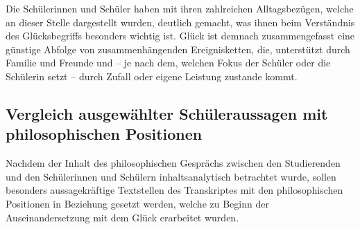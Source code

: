 Die Schülerinnen und Schüler haben mit ihren zahlreichen Alltagsbezügen, welche an dieser Stelle dargestellt wurden, deutlich gemacht, was ihnen beim Verständnis des Glücksbegriffs besonders wichtig ist. 
Glück ist demnach zusammengefasst eine günstige Abfolge von zusammenhängenden Ereignisketten, die, unterstützt durch Familie und Freunde und -- je nach dem, welchen Fokus der Schüler oder die Schülerin setzt -- durch Zufall oder eigene Leistung zustande kommt. 


\newpage



\subsection{Vergleich ausgewählter Schüleraussagen mit philosophischen Positionen}

Nachdem der Inhalt des philosophischen Gesprächs zwischen den Studierenden und den Schülerinnen und Schülern inhaltsanalytisch betrachtet wurde, sollen besonders aussagekräftige Textstellen des Transkriptes mit den philosophischen Positionen in Beziehung gesetzt werden, welche zu Beginn der Auseinandersetzung mit dem Glück erarbeitet wurden.


